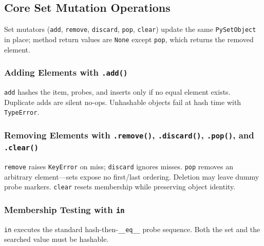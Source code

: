 \subsection{Core Set Mutation Operations}

Set mutators (\texttt{add}, \texttt{remove}, \texttt{discard}, \texttt{pop}, \texttt{clear}) update the same \texttt{PySetObject} in place; method return values are \texttt{None} except \texttt{pop}, which returns the removed element.

\subsubsection{Adding Elements with \texttt{.add()}}

\texttt{add} hashes the item, probes, and inserts only if no equal element exists. Duplicate adds are silent no-ops. Unhashable objects fail at hash time with \texttt{TypeError}.

\subsubsection{Removing Elements with \texttt{.remove()}, \texttt{.discard()}, \texttt{.pop()}, and \texttt{.clear()}}

\texttt{remove} raises \texttt{KeyError} on miss; \texttt{discard} ignores misses. \texttt{pop} removes an arbitrary element---sets expose no first/last ordering. Deletion may leave dummy probe markers. \texttt{clear} resets membership while preserving object identity.

\subsubsection{Membership Testing with \texttt{in}}

\texttt{in} executes the standard hash-then-\texttt{\_\_eq\_\_} probe sequence. Both the set and the searched value must be hashable.
